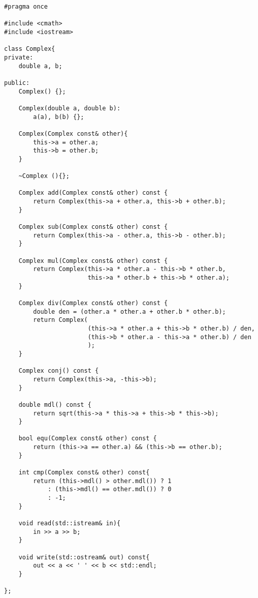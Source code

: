 \documentclass[12pt]{article}
\begin{document}
\begin{lstlisting}[label=some-code,caption={Complex.hpp}]
#pragma once

#include <cmath>
#include <iostream>

class Complex{
private:
    double a, b;

public:
    Complex() {};

    Complex(double a, double b):
        a(a), b(b) {};
    
    Complex(Complex const& other){
        this->a = other.a;
        this->b = other.b;
    }
    
    ~Complex (){};

    Complex add(Complex const& other) const {
        return Complex(this->a + other.a, this->b + other.b);
    }
    
    Complex sub(Complex const& other) const {
        return Complex(this->a - other.a, this->b - other.b);
    }
    
    Complex mul(Complex const& other) const {
        return Complex(this->a * other.a - this->b * other.b,
                       this->a * other.b + this->b * other.a);
    }
    
    Complex div(Complex const& other) const {
        double den = (other.a * other.a + other.b * other.b);            
        return Complex(
                       (this->a * other.a + this->b * other.b) / den,
                       (this->b * other.a - this->a * other.b) / den
                       );
    }

    Complex conj() const {
        return Complex(this->a, -this->b);
    }

    double mdl() const {
        return sqrt(this->a * this->a + this->b * this->b);
    }
    
    bool equ(Complex const& other) const {
        return (this->a == other.a) && (this->b == other.b);
    }

    int cmp(Complex const& other) const{
        return (this->mdl() > other.mdl()) ? 1
            : (this->mdl() == other.mdl()) ? 0
            : -1;
    }

    void read(std::istream& in){
        in >> a >> b;
    }

    void write(std::ostream& out) const{
        out << a << ' ' << b << std::endl;
    }
    
};

\end{lstlisting}
\pagebreak
\end{document}
